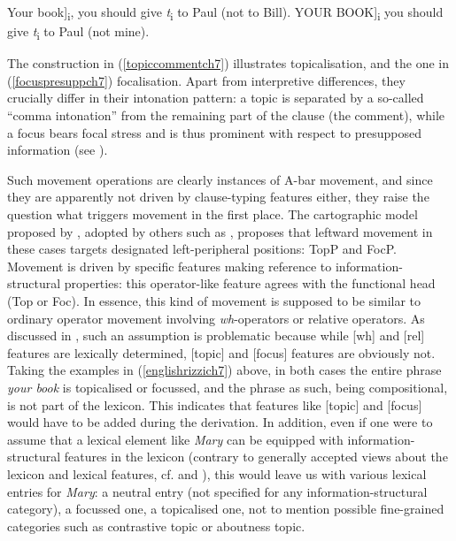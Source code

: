 \ea \label{englishrizzich7}
\ea {[}Your book]\textsubscript{i}, you should give \textit{t}\textsubscript{i} to Paul (not to Bill). \label{topiccommentch7}
\ex {[}YOUR BOOK]\textsubscript{i} you should give \textit{t}\textsubscript{i} to Paul (not mine). \label{focuspresuppch7}
\z
\z

The construction in (\ref{topiccommentch7}) illustrates topicalisation, and the one in (\ref{focuspresuppch7}) focalisation. Apart from interpretive differences, they crucially differ in their intonation pattern: a topic is separated by a so-called ``comma intonation'' from the remaining part of the clause (the comment), while a focus bears focal stress and is thus prominent with respect to presupposed information (see \citealt[258]{rizzi1997}).

Such movement operations are clearly instances of A-bar movement, and since they are apparently not driven by clause-typing features either, they raise the question what triggers movement in the first place. The cartographic model proposed by \citet{rizzi1997}, adopted by others such as \citet{poletto2006}, proposes that leftward movement in these cases targets designated left-peripheral positions: TopP and FocP. Movement is driven by specific features making reference to information-structural properties: this operator-like feature agrees with the functional head (Top or Foc). In essence, this kind of movement is supposed to be similar to ordinary operator movement involving \textit{wh}-operators or relative operators. As discussed in , such an assumption is problematic because while [wh] and [rel] features are lexically determined, [topic] and [focus] features are obviously not. Taking the examples in (\ref{englishrizzich7}) above, in both cases the entire phrase \textit{your book} is topicalised or focussed, and the phrase as such, being compositional, is not part of the lexicon. This indicates that features like [topic] and [focus] would have to be added during the derivation. In addition, even if one were to assume that a lexical element like \textit{Mary} can be equipped with information-structural features in the lexicon (contrary to generally accepted views about the lexicon and lexical features, cf. \citealt{neelemanszendroei2004} and \citealt{dendikken2006}), this would leave us with various lexical entries for \textit{Mary}: a neutral entry (not specified for any information-structural category), a focussed one, a topicalised one, not to mention possible fine-grained categories such as contrastive topic or aboutness topic. 

